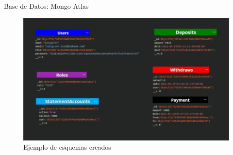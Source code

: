 \documentclass[xcolor=pdftex,dvipsnames,table]{beamer}
\begin{document}
\begin{frame}{Base de Datos: Mongo Atlas}
    \begin{figure}[htb]
        \centering
        \captionsetup{justification=centering,margin=0.3cm}
        \includegraphics[width=1\linewidth]{bd/bdmiaex.png}
        \caption*{\footnotesize  Ejemplo de esquemas creados }
    \end{figure} 
\end{frame}
\end{document}
